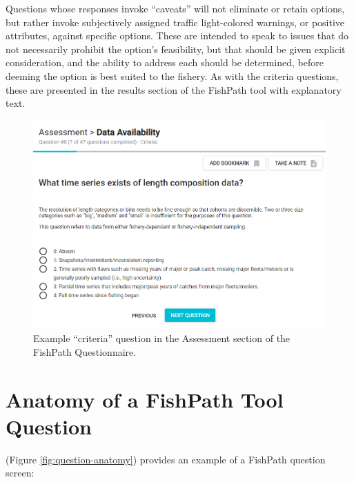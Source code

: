 \documentclass[11pt,]{book}
\begin{document}
Questions whose responses invoke ``caveats'' will not eliminate or retain options, but rather invoke subjectively assigned traffic light-colored warnings, or positive attributes, against specific options. These are intended to speak to issues that do not necessarily prohibit the option's feasibility, but that should be given explicit consideration, and the ability to address each should be determined, before deeming the option is best suited to the fishery. As with the criteria questions, these are presented in the results section of the FishPath tool with explanatory text.

\begin{figure}
 
 {\centering \includegraphics[width=0.95\linewidth]{images/ex-crit-question} 
 
 }
 
 \caption{Example “criteria” question in the Assessment section of the FishPath Questionnaire.}\label{fig:ex-crit-question}
 \end{figure}

\hypertarget{anatomy-of-a-fishpath-tool-question}{%
\section{Anatomy of a FishPath Tool Question}\label{anatomy-of-a-fishpath-tool-question}}

(Figure \ref{fig:question-anatomy}) provides an example of a FishPath question screen:
\end{document}
